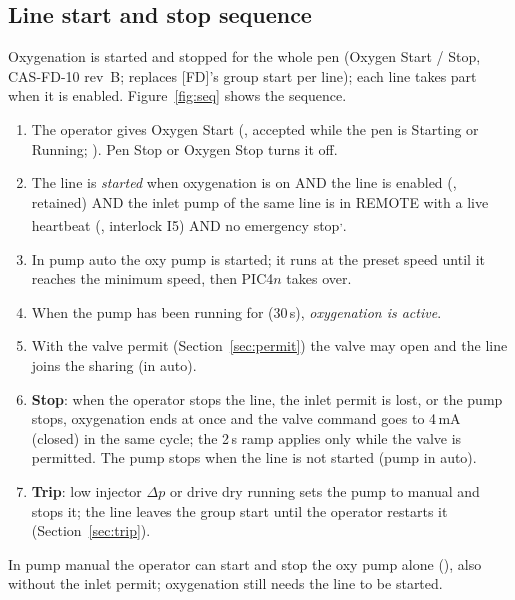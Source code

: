 \documentclass[11pt,a4paper]{article}
\begin{document}
\subsection{Line start and stop sequence}
\label{sec:seq}
Oxygenation is started and stopped for the whole pen (Oxygen Start / Stop, CAS-FD-10 rev~B; replaces
[FD]'s group start per line); each line takes part when it is enabled. Figure~\ref{fig:seq} shows the
sequence.
\begin{enumerate}[nosep]
  \item The operator gives Oxygen Start (, accepted while the pen is Starting or
        Running; ). Pen Stop or Oxygen Stop turns it off.
  \item The line is \emph{started} when oxygenation is on AND the line is enabled (,
        retained) AND the inlet pump of the same line is
        in REMOTE with a live heartbeat (, interlock
        I5) AND no emergency stop\textsuperscript{,}.
  \item In pump auto the oxy pump is started; it runs at the preset speed until it reaches
        the minimum speed, then PIC4$n$ takes over.
  \item When the pump has been running for  (30\,s), \emph{oxygenation is active}.
  \item With the valve permit (Section~\ref{sec:permit}) the valve may open and the line joins the
        sharing (in auto).
  \item \textbf{Stop}: when the operator stops the line, the inlet permit is lost, or the pump
        stops, oxygenation ends at once and the valve command goes to 4\,mA (closed) in the same
        cycle; the 2\,s ramp applies only while the valve is permitted. The pump stops when the line
        is not started (pump in auto).
  \item \textbf{Trip}: low injector $\Delta p$ or drive dry running sets the pump to manual and stops
        it; the line leaves the group start until the operator restarts it (Section~\ref{sec:trip}).
\end{enumerate}
In pump manual the operator can start and stop the oxy pump alone (),
also without the inlet permit; oxygenation still needs the line to be started.
\end{document}
